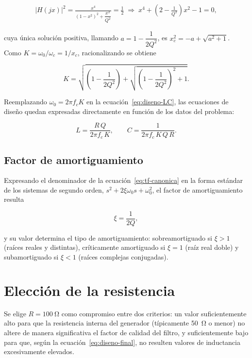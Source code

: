 \begin{gather*}
  |H(jx)|^2 = \frac{x^4}{\left(1 - x^2\right)^2 + \dfrac{x^2}{Q^2}} = \frac{1}{2}
  \;\Longrightarrow\;
  x^4 + \left(2 - \frac{1}{Q^2}\right) x^2 - 1 = 0,
\end{gather*}

cuya única solución positiva, llamando $a = 1 - \dfrac{1}{2Q^2}$, es $x_c^2 = -a + \sqrt{a^2 + 1}$. Como
$K = \omega_0/\omega_c = 1/x_c$, racionalizando se obtiene

\begin{equation}
  K = \sqrt{\left(1 - \frac{1}{2Q^2}\right) + \sqrt{\left(1 - \frac{1}{2Q^2}\right)^2 + 1}}.
  \label{eq:factor-K}
\end{equation}

Reemplazando $\omega_0 = 2\pi f_c K$ en la ecuación~\eqref{eq:diseno-LC}, las ecuaciones de diseño
quedan expresadas directamente en función de los datos del problema:

\begin{equation}
  L = \frac{R\,Q}{2\pi f_c\, K}, \qquad C = \frac{1}{2\pi f_c\, K\, Q\, R}.
  \label{eq:diseno-final}
\end{equation}

\subsection{Factor de amortiguamiento}

Expresando el denominador de la ecuación~\eqref{eq:tf-canonica} en la forma estándar de los sistemas de
segundo orden, $s^2 + 2\xi\omega_0 s + \omega_0^2$, el factor de amortiguamiento resulta

\begin{equation}
  \xi = \frac{1}{2Q},
  \label{eq:xi}
\end{equation}

y su valor determina el tipo de amortiguamiento: sobreamortiguado si $\xi > 1$ (raíces reales y distintas),
críticamente amortiguado si $\xi = 1$ (raíz real doble) y subamortiguado si $\xi < 1$ (raíces complejas
conjugadas).

\section{Elección de la resistencia}

Se elige $R = \qty{100}{\ohm}$ como compromiso entre dos criterios: un valor suficientemente alto para que
la resistencia interna del generador (típicamente \qty{50}{\ohm} o menor) no altere de manera significativa
el factor de calidad del filtro, y suficientemente bajo para que, según la ecuación~\eqref{eq:diseno-final},
no resulten valores de inductancia excesivamente elevados.

